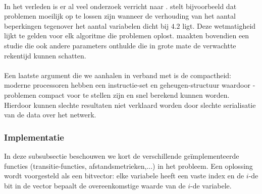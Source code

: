 \paragraph{}
In het verleden is er al veel onderzoek verricht naar . \cite{satDifficult} stelt bijvoorbeeld dat  problemen moeilijk op te lossen zijn wanneer de verhouding van het aantal beperkingen tegenover het aantal variabelen dicht bij $4.2$ ligt. Deze wetmatigheid lijkt te gelden voor elk algoritme die  problemen oplost. \cite{satHardness} maakten bovendien een studie die ook andere parameters onthulde die in grote mate de verwachtte rekentijd kunnen schatten.

\paragraph{}
Een laatste argument die we aanhalen in verband met  is de compactheid: moderne processoren hebben een instructie-set en geheugen-structuur waardoor -problemen compact voor te stellen zijn en snel berekend kunnen worden. Hierdoor kunnen slechte resultaten niet verklaard worden door slechte serialisatie van de data over het netwerk.

\subsubsection{Implementatie}

In deze subsubsectie beschouwen we kort de verschillende ge\"implementeerde functies (transitie-functies, afstandsmetrieken,...) in het  probleem. Een oplossing wordt voorgesteld als een bitvector: elke variabele heeft een vaste index en de $i$-de bit in de vector bepaalt de overeenkomstige waarde van de $i$-de variabele.

